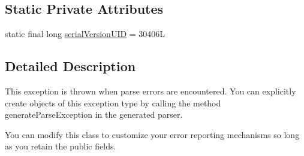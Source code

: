 \subsection*{Static Private Attributes}
\begin{DoxyCompactItemize}
\item 
static final long \hyperlink{classuk_1_1ac_1_1manchester_1_1cs_1_1owlapi_1_1dlsyntax_1_1parser_1_1_parse_exception_af29891ee959dff0a45865efca182b152}{serial\-Version\-U\-I\-D} = 30406\-L
\end{DoxyCompactItemize}


\subsection{Detailed Description}
This exception is thrown when parse errors are encountered. You can explicitly create objects of this exception type by calling the method generate\-Parse\-Exception in the generated parser.

You can modify this class to customize your error reporting mechanisms so long as you retain the public fields. 

